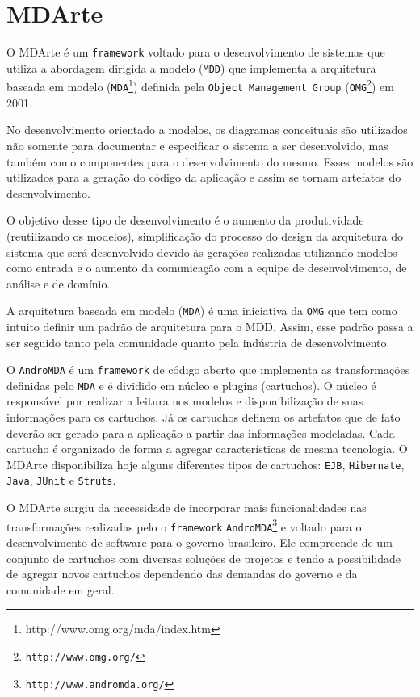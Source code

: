 \chapter{MDArte}
O MDArte é um \texttt{framework} voltado para o desenvolvimento de sistemas que
utiliza a abordagem dirigida a modelo (\texttt{MDD}) que implementa a
arquitetura baseada em modelo
(\texttt{MDA}\footnote{http://www.omg.org/mda/index.htm}) definida pela
\texttt{Object Management Group} (\texttt{OMG\footnote{http://www.omg.org/}}) em 2001.

No desenvolvimento orientado a modelos, os diagramas conceituais são utilizados
não somente para documentar e especificar o sistema a ser desenvolvido, mas
também como componentes para o desenvolvimento do mesmo. Esses modelos são
utilizados para a geração do código da aplicação e assim se tornam artefatos do
desenvolvimento.

O objetivo desse tipo de desenvolvimento é o aumento da produtividade
(reutilizando os modelos), simplificação do processo do design da arquitetura do
sistema que será desenvolvido devido às gerações realizadas utilizando modelos
como entrada e o aumento da comunicação com a equipe de desenvolvimento, de
análise e de domínio.

A arquitetura baseada em modelo (\texttt{MDA}) é uma iniciativa da \texttt{OMG}
que tem como intuito definir um padrão de arquitetura para o MDD. Assim, esse padrão passa a
ser seguido tanto pela comunidade quanto pela indústria de desenvolvimento.

O \texttt{AndroMDA} é um \texttt{framework} de código aberto que implementa as
transformações definidas pelo \texttt{MDA} e é dividido em núcleo e plugins
(cartuchos). O núcleo é responsável por realizar a leitura nos modelos e disponibilização de suas
informações para os cartuchos. Já os cartuchos definem os artefatos que de fato
deverão ser gerado para a aplicação a partir das informações modeladas. Cada
cartucho é organizado de forma a agregar características de mesma tecnologia.
O MDArte disponibiliza hoje alguns diferentes tipos de cartuchos: \texttt{EJB},
\texttt{Hibernate}, \texttt{Java}, \texttt{JUnit} e \texttt{Struts}.

O MDArte surgiu da necessidade de incorporar mais funcionalidades nas
transformações realizadas pelo o \texttt{framework}
\texttt{AndroMDA\footnote{http://www.andromda.org/}} e voltado para o
desenvolvimento de software para o governo brasileiro. Ele compreende de um conjunto de cartuchos
com diversas soluções de projetos e tendo a possibilidade de agregar novos
cartuchos dependendo das demandas do governo e da comunidade em geral.